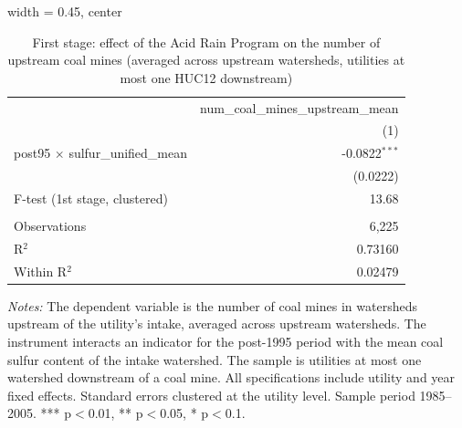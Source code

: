 
\begin{table}[htbp]
   
   \caption{\label{tab:fs_dwnstrm_minevio} First stage: effect of the Acid Rain Program on the number of upstream coal mines (averaged across upstream watersheds, utilities at most one HUC12 downstream)}
   \bigskip
   
   \centering
   
   \begin{adjustbox}{width = 0.45\textwidth, center}
      
      
      \begin{tabular}{lr}
         \toprule
         
                                                  & num\_coal\_mines\_upstream\_mean\\      
         
                                                  & (1)\\  
         
         \midrule 
         post95 $\times$ sulfur\_unified\_mean    & -0.0822$^{***}$\\   
                                                  & (0.0222)\\   
         
         F-test (1st stage, clustered)            & 13.68\\  
         
          \\
         
         Observations                             & 6,225\\  
         R$^2$                                    & 0.73160\\  
         Within R$^2$                             & 0.02479\\  
         
         \bottomrule
         
      \end{tabular}
      
      
      
   \end{adjustbox}
      {\tiny\linespread{1}\selectfont \par \raggedright 
   \textit{Notes:} The dependent variable is the number of coal mines in watersheds upstream of the utility's intake, averaged across upstream watersheds. The instrument interacts an indicator for the post-1995 period with the mean coal sulfur content of the intake watershed. The sample is utilities at most one watershed downstream of a coal mine. All specifications include utility and year fixed effects. Standard errors clustered at the utility level. Sample period 1985--2005. *** p$<$0.01, ** p$<$0.05, * p$<$0.1.}
   
\end{table}


